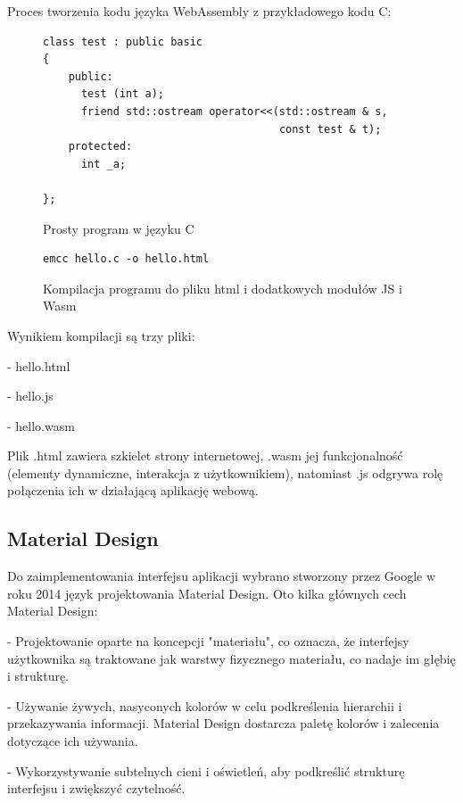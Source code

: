\documentclass[a4paper,twoside,12pt]{book}
\begin{document}
Proces tworzenia kodu języka WebAssembly z przykładowego kodu C:

\begin{figure}
\centering
\begin{lstlisting}
class test : public basic
{
    public:
      test (int a);
      friend std::ostream operator<<(std::ostream & s, 
                                     const test & t);
    protected:
      int _a;  
      
};
\end{lstlisting}
\caption{Prosty program w języku C}
\label{fig:pseudokod:listings}
\end{figure}

\begin{figure}
\centering
\begin{lstlisting}
emcc hello.c -o hello.html
\end{lstlisting}
\caption{Kompilacja programu do pliku html i dodatkowych modułów JS i Wasm}
\label{fig:pseudokod:listings}
\end{figure}

\hfill\break
\hfill\break
\hfill\break
\hfill\break
Wynikiem kompilacji są trzy pliki:

- hello.html

- hello.js

- hello.wasm

Plik .html zawiera szkielet strony internetowej, .wasm jej 
funkcjonalność (elementy dynamiczne, interakcja z użytkownikiem), natomiast 
.js odgrywa rolę połączenia ich w działającą aplikację webową.

\subsection{Material Design}
Do zaimplementowania interfejsu aplikacji wybrano stworzony przez 
Google w roku 2014 język projektowania Material Design. 
Oto kilka głównych cech Material Design:

- Projektowanie oparte na koncepcji "materiału", co oznacza, że interfejsy użytkownika są traktowane jak warstwy fizycznego materiału, co nadaje im głębię i strukturę.

- Używanie żywych, nasyconych kolorów w celu podkreślenia hierarchii i przekazywania informacji. Material Design dostarcza paletę kolorów i zalecenia dotyczące ich używania.

- Wykorzystywanie subtelnych cieni i oświetleń, aby podkreślić strukturę interfejsu i zwiększyć czytelność.
\end{document}
